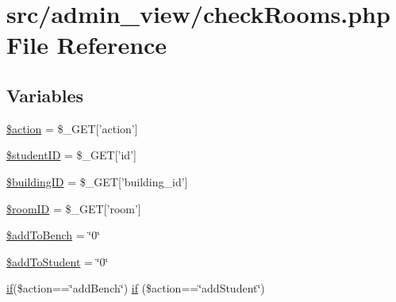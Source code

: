 \hypertarget{checkRooms_8php}{\section{src/admin\-\_\-view/check\-Rooms.php \-File \-Reference}
\label{checkRooms_8php}
}
\subsection*{\-Variables}
\begin{DoxyCompactItemize}
\item 
\hyperlink{checkRooms_8php_aa698a3e72116e8e778be0e95d908ee30}{\$action} = \$\-\_\-\-G\-E\-T\mbox{[}'action'\mbox{]}
\item 
\hyperlink{checkRooms_8php_af62eac6f1a6ea66c9f90093940147945}{\$student\-I\-D} = \$\-\_\-\-G\-E\-T\mbox{[}'id'\mbox{]}
\item 
\hyperlink{checkRooms_8php_acfaa0ff73c631ce07c4851ed12fcd83d}{\$building\-I\-D} = \$\-\_\-\-G\-E\-T\mbox{[}'building\-\_\-id'\mbox{]}
\item 
\hyperlink{checkRooms_8php_a61034568ba6e795a925d00afa98d3797}{\$room\-I\-D} = \$\-\_\-\-G\-E\-T\mbox{[}'room'\mbox{]}
\item 
\hyperlink{checkRooms_8php_a203f48bd509ef90819599e761f574023}{\$add\-To\-Bench} = \char`\"{}0\char`\"{}
\item 
\hyperlink{checkRooms_8php_ab8b532875ded9bdf4075f627ddf2fa78}{\$add\-To\-Student} = \char`\"{}0\char`\"{}
\item 
\hyperlink{updateBenchDB_8php_a0c1f2915e12defa9f4d515347d884dee}{if}(\$action==\char`\"{}add\-Bench\char`\"{}) \hyperlink{checkRooms_8php_a8e6545ce0238da2ec377455ff693414e}{if} (\$action==\char`\"{}add\-Student\char`\"{})
\end{DoxyCompactItemize}


